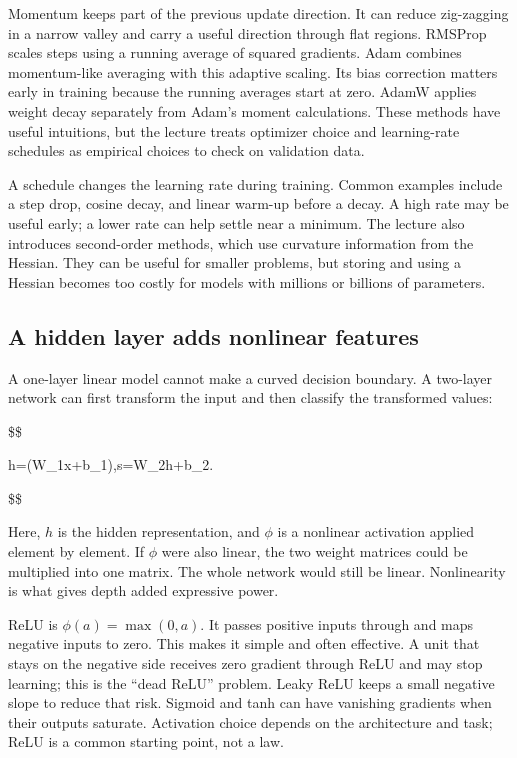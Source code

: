 Momentum keeps part of the previous update direction. It can reduce zig-zagging in a narrow valley and carry a useful direction through flat regions. RMSProp scales steps using a running average of squared gradients. Adam combines momentum-like averaging with this adaptive scaling. Its bias correction matters early in training because the running averages start at zero. AdamW applies weight decay separately from Adam's moment calculations. These methods have useful intuitions, but the lecture treats optimizer choice and learning-rate schedules as empirical choices to check on validation data.

A schedule changes the learning rate during training. Common examples include a step drop, cosine decay, and linear warm-up before a decay. A high rate may be useful early; a lower rate can help settle near a minimum. The lecture also introduces second-order methods, which use curvature information from the Hessian. They can be useful for smaller problems, but storing and using a Hessian becomes too costly for models with millions or billions of parameters.

\subsection{A hidden layer adds nonlinear features}\label{04-visual-computing-ii-ch031-a-hidden-layer-adds-nonlinear-features}

A one-layer linear model cannot make a curved decision boundary. A two-layer network can first transform the input and then classify the transformed values:

\$\$

h=\phi(W\_1x+b\_1),\qquad s=W\_2h+b\_2.

\$\$

Here, \(h\) is the hidden representation, and \(\phi\) is a nonlinear activation applied element by element. If \(\phi\) were also linear, the two weight matrices could be multiplied into one matrix. The whole network would still be linear. Nonlinearity is what gives depth added expressive power.

ReLU is \(\phi(a)=\max(0,a)\). It passes positive inputs through and maps negative inputs to zero. This makes it simple and often effective. A unit that stays on the negative side receives zero gradient through ReLU and may stop learning; this is the ``dead ReLU'' problem. Leaky ReLU keeps a small negative slope to reduce that risk. Sigmoid and tanh can have vanishing gradients when their outputs saturate. Activation choice depends on the architecture and task; ReLU is a common starting point, not a law.

